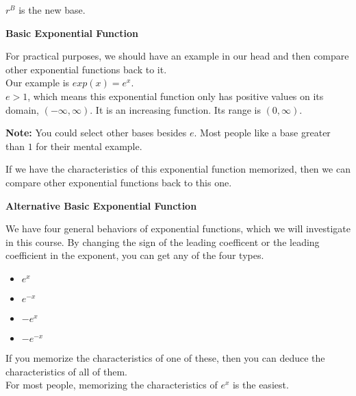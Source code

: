 \documentclass{ximera}
\begin{document}
$r^{B}$ is the new base.








\begin{idea} \textbf{\textcolor{red!70!black}{Basic Exponential Function}}


For practical purposes, we should have an example in our head and then compare other exponential functions back to it. \\

Our example is  $exp(x) = e^x$. \\


$e > 1$, which means this exponential function only has positive values on its domain, $(-\infty, \infty)$.  It is an increasing function. Its range is $(0, \infty)$.

\textbf{Note:} You could select other bases besides $e$.  Most people like a base greater than $1$ for their mental example.


\end{idea}

If we have the characteristics of this exponential function memorized, then we can compare other exponential functions back to this one.





\begin{idea} \textbf{\textcolor{red!70!black}{Alternative Basic Exponential Function}}


We have four general behaviors of exponential functions, which we will investigate in this course. By changing the sign of the leading coefficent or the leading coefficient in the exponent, you can get any of the four  types.  


\begin{itemize}
\item $e^x$
\item $e^{-x}$
\item $-e^x$
\item $-e^{-x}$
\end{itemize}


If you memorize the characteristics of one of these, then you can deduce the characteristics of all of them. \\

For most people, memorizing the characteristics of $e^x$ is the easiest.


\end{idea}
\end{document}
